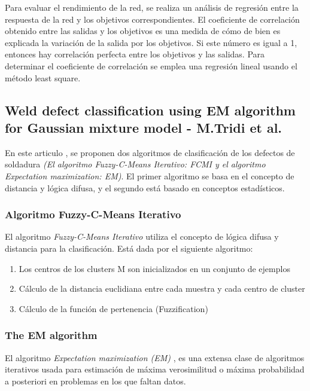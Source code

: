 Para evaluar el rendimiento de la red, se realiza un análisis de regresión entre la respuesta de la red y los objetivos correspondientes. El coeficiente de correlación obtenido entre las salidas y los objetivos es una medida de cómo de bien es explicada la variación de la salida por los objetivos. Si este número es igual a 1, entonces hay correlación perfecta entre los objetivos y las salidas. Para determinar el coeficiente de correlación se emplea una regresión lineal usando el método least square.


\subsection{Weld defect classification using EM algorithm for Gaussian mixture model - M.Tridi et al.}
En este articulo \cite{Tridi}, se proponen dos algoritmos de clasificación de los defectos de soldadura  \textit{(El algoritmo Fuzzy-C-Means Iterativo: FCMI y el algoritmo Expectation maximization: EM)}.
El primer algoritmo se basa en el concepto de distancia y lógica difusa, y el segundo está basado en conceptos estadísticos. 


\subsubsection{Algoritmo Fuzzy-C-Means Iterativo} 
El algoritmo \textit{Fuzzy-C-Means Iterativo} \cite{kandel1999introduction} utiliza el concepto de lógica difusa y distancia para la clasificación. Está dada por el siguiente algoritmo:
	\begin{enumerate}
	\item Los centros de los clusters M son inicializados en un conjunto de ejemplos
	\item Cálculo de la distancia euclidiana entre cada muestra y cada centro de cluster
	\item Cálculo de la función de pertenencia (Fuzzification) 
	\end{enumerate}


\subsubsection{The EM algorithm}
El algoritmo \textit{Expectation maximization (EM)} \cite{zhang2003algorithms}, es una extensa clase de algoritmos iterativos usada para estimación de máxima verosimilitud o máxima probabilidad a posteriori en problemas en los que faltan datos.



